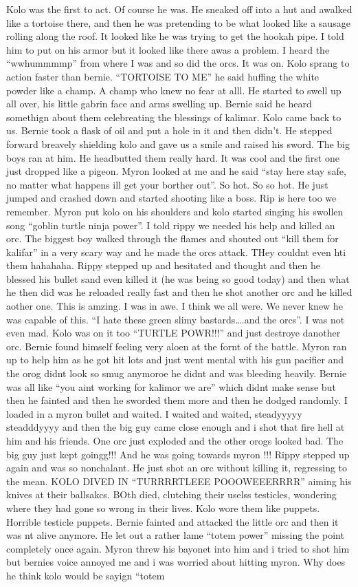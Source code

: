 Kolo was the first to act. Of course he was. He sneaked off into a hut and awalked like a tortoise there, and then he was pretending to be what looked like a sausage rolling along the roof. It looked like he was trying to get the hookah pipe. I told him to put on his armor but it looked like there awas a problem. I heard the “wwhummmmp” from where I was and so did the orcs. It was on. Kolo sprang to action faster than bernie. “TORTOISE TO ME” he said huffing the white powder like a champ. A champ who knew no fear at alll. He started to swell up all over, his little gabrin face and arms swelling up. Bernie said he heard somethign about them celebreating the blessings of kalimar. Kolo came back to us. Bernie took a flask of oil and put a hole in it and then didn’t. He stepped forward breavely shielding kolo and gave us a smile and raised his sword. The big boys ran at him. He headbutted them really hard. It was cool and the first one just dropped like a pigeon. Myron looked at me and he said “stay here stay safe, no matter what happens ill get your borther out”. So hot. So so hot. He just jumped and crashed down and started shooting like a boss. Rip is here too we remember. Myron put kolo on his shoulders and kolo started singing his swollen song “goblin turtle ninja power”. I told rippy we needed his help and killed an orc. The biggest boy walked through the flames and shouted out “kill them for kalifar” in a very scary way and he made the orcs attack. THey couldnt even hti them hahahaha. Rippy stepped up and hesitated and thought and then he blessed his bullet sand even killed it (he was being so good today) and then what he then did was he reloaded really fast and then he shot another orc and he killed aother one. This is amzing. I was in awe. I think we all were. We never knew he was capable of this. “I hate these green slimy bastards….and the orcs”. I was not even mad. Kolo was on it too “TURTLE POWR!!!” and just destroye danother orc. Bernie found himself feeling very aloen at the fornt of the battle. Myron ran up to help him as he got hit lots and just went mental with his gun pacifier and the orog didnt look so smug anymoroe he didnt and was bleeding heavily. Bernie was all like “you aint working for kalimor we are” which didnt make sense but then he fainted and then he sworded them more and then he dodged randomly. I loaded in a myron bullet and waited. I waited and waited, steadyyyyy steadddyyyy and then the big guy came close enough and i shot that fire hell at him and his friends. One orc just exploded and the other orogs looked bad. The big guy just kept goingg!!! And he was going towards myron !!! Rippy stepped up again and was so nonchalant. He just shot an orc without killing it, regressing to the mean. KOLO DIVED IN “TURRRRTLEEE POOOWEEERRRR” aiming his knives at their ballsakcs. BOth died, clutching their uselss testicles, wondering where they had gone so wrong in their lives. Kolo wore them like puppets. Horrible testicle puppets. Bernie fainted and attacked the little orc and then it was nt alive anymore. He let out a rather lame “totem power” missing the point completely once again. Myron threw his bayonet into him and i tried to shot him but bernies voice annoyed me and i was worried about hitting myron. Why does he think kolo would be sayign “totem 